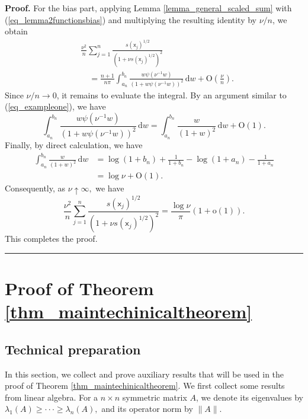 \documentclass[11pt]{article}
\newcommand{\sfx}{\mathsf{x}}
\newenvironment{proof}[1][Proof]{\noindent\textbf{#1.} }{\ \rule{0.5em}{0.5em}}
\numberwithin{equation}{section}
\numberwithin{figure}{section}
\begin{document}
\begin{proof}
For the bias part, applying Lemma \ref{lemma_general_scaled_sum} with (\ref{eq_lemma2functionsbias}) and multiplying the resulting identity by \(\nu/n\), we obtain
\begin{equation*}
\begin{aligned}
&\frac{\nu^2}{n}\sum_{j=1}^n
\frac{s(\sfx_j)^{1/2}}
{(1+\nu s(\sfx_j)^{1/2})^2} \\
&\quad=
\frac{n+1}{n\pi}
\int_{a_n}^{b_n}
\frac{w\psi(\nu^{-1}w)}
{(1+w\psi(\nu^{-1}w))^2}
\,\mathrm{d}w
+\mathrm{O}\left(\frac{\nu}{n}\right).
\end{aligned}
\end{equation*}
Since \(\nu/n\to0\), it remains to evaluate the integral. By an argument similar to (\ref{eq_exampleone}), we have 
\begin{equation*}
\int_{a_n}^{b_n}
\frac{w\psi(\nu^{-1}w)}
{(1+w\psi(\nu^{-1}w))^2}
\,\mathrm{d}w
=
\int_{a_n}^{b_n}
\frac{w}{(1+w)^2}\,\mathrm{d}w
+\mathrm{O}(1).
\end{equation*}
Finally, by direct calculation, we have 
\begin{equation*}
\begin{aligned}
\int_{a_n}^{b_n}\frac{w}{(1+w)^2}\,\mathrm{d}w
&=
\log(1+b_n)
+\frac{1}{1+b_n}
-\log(1+a_n)
-\frac{1}{1+a_n} \\
&=
\log\nu+\mathrm{O}(1).
\end{aligned}
\end{equation*}
Consequently, as $\nu \uparrow \infty,$ we have 
\begin{equation*}
\frac{\nu^2}{n}\sum_{j=1}^n
\frac{s(\sfx_j)^{1/2}}
{(1+\nu s(\sfx_j)^{1/2})^2}
=
\frac{\log\nu}{\pi}(1+\mathrm{o}(1)).
\end{equation*}
This completes the proof.
\end{proof}


\section{Proof of Theorem \ref{thm_maintechinicaltheorem}}\label{appendix_technical_lemmas}

\subsection{Technical preparation}

In this section, we collect and prove auxiliary results that will be used in the proof of Theorem \ref{thm_maintechinicaltheorem}. We first collect some results from linear algebra. For a $n \times
 n$ symmetric matrix $A$, we denote 
its eigenvalues by $\lambda_{1}(A)\geq\cdot\cdot\cdot\geq\lambda_{n}(A),$ and its operator norm by $\|A \|.$
\end{document}
